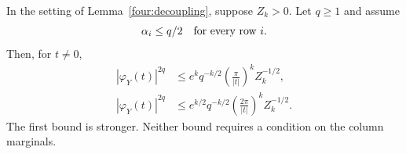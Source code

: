 \begin{lemma}\label{four:volume}
In the setting of Lemma~\ref{four:decoupling}, suppose \(Z_k>0\).
Let \(q\geq1\) and assume
\begin{equation}\label{four:volume-gate}
 \alpha_i\leq q/2\quad\hbox{for every row }i.
\end{equation}
Then, for \(t\ne0\),
\begin{align}
 |\varphi_Y(t)|^{2q}
 &\leq e^k q^{-k/2}
          \left(\frac{\pi}{|t|}\right)^kZ_k^{-1/2},
 \label{four:volume-sharp-decay}\\
 |\varphi_Y(t)|^{2q}
 &\leq e^{k/2}q^{-k/2}
          \left(\frac{2\pi}{|t|}\right)^kZ_k^{-1/2}.
 \label{four:volume-classical-decay}
\end{align}
The first bound is stronger.  Neither bound requires a condition on
the column marginals.
\end{lemma}
